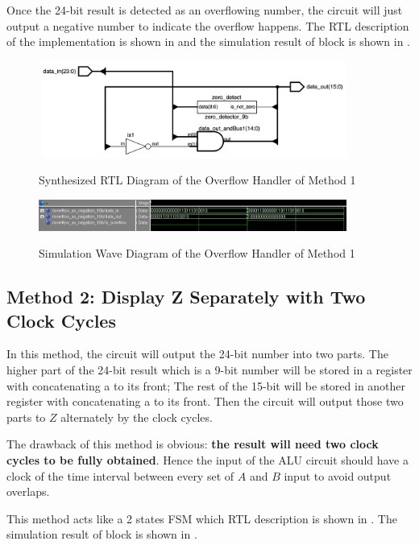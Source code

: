 Once the 24-bit result is detected as an overflowing number,
the circuit will just output a negative number to indicate the overflow happens.
The RTL description of the implementation is shown in  and the simulation result of block is shown in .

\begin{figure}[!ht]
	\centering
	\caption{Synthesized RTL Diagram of the Overflow Handler of Method 1}
	\includegraphics[width=0.9\textwidth]{../img/neg_rtl.png}
	\label{fig:neg_rtl}
\end{figure}

\begin{figure}[!ht]
	\centering
	\caption{Simulation Wave Diagram of the Overflow Handler of Method 1}
	\includegraphics[width=0.9\textwidth]{../img/neg_sim.png}
	\label{fig:neg_sim}
\end{figure}

\subsection{Method 2: Display Z Separately with Two Clock Cycles}

In this method, the circuit will output the 24-bit number into two parts.
The higher part of the 24-bit result which is a 9-bit number
will be stored in a register with concatenating a  to its front;
The rest of the 15-bit will be stored in another register with concatenating a  to its front.
Then the circuit will output those two parts to \(Z\) alternately by the clock cycles.

The drawback of this method is obvious: \textbf{the result will need two clock cycles to be fully obtained}.
Hence the input of the ALU circuit should have a clock of the time interval between every set of \(A\) and \(B\) input
to avoid output overlaps.

This method acts like a 2 states FSM which RTL description is shown in .
The simulation result of block is shown in .

